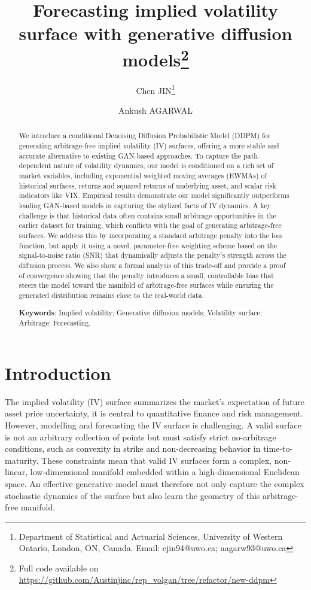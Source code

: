 \documentclass{article}
\title{Forecasting implied volatility surface with generative diffusion models\footnote{Full code available on \url{https://github.com/Austinjinc/rep_volgan/tree/refactor/new-ddpm}}}
\author{
Chen JIN\thanks{Department of Statistical and Actuarial Sciences, University of Western Ontario, London, ON, Canada. Email: cjin94@uwo.ca; aagarw93@uwo.ca} \and Ankush AGARWAL\footnotemark[2]
}
\begin{document}
\maketitle
\begin{abstract}
\noindent We introduce a conditional Denoising Diffusion Probabilistic Model (DDPM) for
generating arbitrage-free implied volatility (IV) surfaces, offering a more stable and accurate
alternative to existing GAN-based approaches. To capture the path-dependent nature of
volatility dynamics, our model is conditioned on a rich set of market variables, including
exponential weighted moving averages (EWMAs) of historical surfaces, returns and squared
returns of underlying asset, and scalar risk indicators like VIX. Empirical results demonstrate our
model significantly outperforms leading GAN-based models in capturing the stylized facts of IV
dynamics. A key challenge is that historical data often contains small arbitrage opportunities in
the earlier dataset for training, which conflicts with the goal of generating arbitrage-free
surfaces. We address this by incorporating a standard arbitrage penalty into the loss function,
but apply it using a novel, parameter-free weighting scheme based on the signal-to-noise ratio
(SNR) that dynamically adjusts the penalty's strength across the diffusion process. We
also show a formal analysis of this trade-off and provide a proof of convergence showing that
the penalty introduces a small, controllable bias that steers the model toward the manifold of
arbitrage-free surfaces while ensuring the generated distribution remains close to the real-world data.

\smallskip

\noindent \textbf{Keywords}: Implied volatility; Generative diffusion models; Volatility surface; Arbitrage; Forecasting.

\end{abstract}

\section{Introduction}

The implied volatility (IV) surface summarizes the market's expectation of future asset price uncertainty, it is central to quantitative finance and risk management. However, modelling and forecasting the IV surface is challenging. A valid surface is not an arbitrary collection of points but must satisfy strict no-arbitrage conditions, such as convexity in strike and non-decreasing behavior in time-to-maturity. These constraints mean that valid IV surfaces form a complex, non-linear, low-dimensional manifold embedded within a high-dimensional Euclidean space. An effective generative model must therefore not only capture the complex stochastic dynamics of the surface but also learn the geometry of this arbitrage-free manifold.
\end{document}
